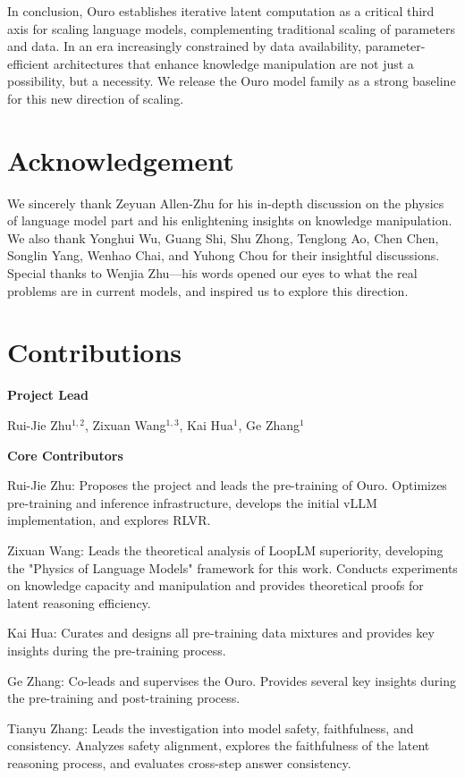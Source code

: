 \documentclass[]{bytedance_seed}
\newcommand{\1}{\mathbf{1}}
\newcommand{\ut}{LoopLM}
\begin{document}
In conclusion, Ouro establishes iterative latent computation as a critical third axis for scaling language models, complementing traditional scaling of parameters and data. In an era increasingly constrained by data availability, parameter-efficient architectures that enhance knowledge manipulation are not just a possibility, but a necessity. We release the Ouro model family as a strong baseline for this new direction of scaling.


\section*{Acknowledgement}
We sincerely thank Zeyuan Allen-Zhu for his in-depth discussion on the physics of language model part and his enlightening insights on knowledge manipulation. We also thank Yonghui Wu, Guang Shi, Shu Zhong, Tenglong Ao, Chen Chen, Songlin Yang, Wenhao Chai, and Yuhong Chou for their insightful discussions. Special thanks to Wenjia Zhu—his words opened our eyes to what the real problems are in current models, and inspired us to explore this direction.
\newpage

\section*{Contributions}

\textbf{Project Lead}

Rui-Jie Zhu$^{1,2}$, Zixuan Wang$^{1,3}$, Kai Hua$^{1}$, Ge Zhang$^{1}$

\textbf{Core Contributors}

Rui-Jie Zhu: Proposes the project and leads the pre-training of Ouro. Optimizes pre-training and inference infrastructure, develops the initial vLLM implementation, and explores RLVR.

Zixuan Wang: Leads the theoretical analysis of \ut{} superiority, developing the "Physics of Language Models" framework for this work. Conducts experiments on knowledge capacity and manipulation and provides theoretical proofs for latent reasoning efficiency.

Kai Hua: Curates and designs all pre-training data mixtures and provides key insights during the pre-training process.

Ge Zhang: Co-leads and supervises the Ouro. Provides several key insights during the pre-training and post-training process.

Tianyu Zhang: Leads the investigation into model safety, faithfulness, and consistency. Analyzes safety alignment, explores the faithfulness of the latent reasoning process, and evaluates cross-step answer consistency.
\end{document}
